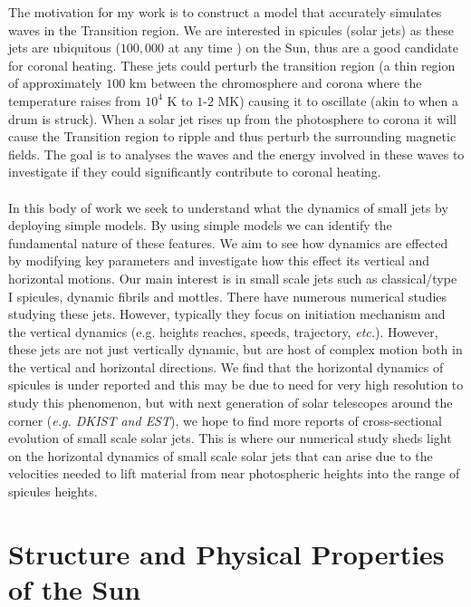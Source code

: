 \documentclass[12pt]{ociamthesis}
\newcommand{\np}{\\ \\}
\begin{document}
The motivation for my work is to construct a model that accurately simulates waves in the Transition region. We are interested in spicules (solar jets) as these jets are ubiquitous ($100,000$  at  any  time \citep{Beckers1968}) on the Sun, thus are a good candidate for coronal heating. These jets could perturb the transition region (a thin region of approximately $100$ km between the chromosphere and corona where the temperature raises from $10^4$ K to $1$-$2$ MK) causing it to oscillate (akin to when a drum is struck). When a solar jet rises up from the photosphere to corona it will cause the Transition region to ripple and thus perturb the surrounding magnetic fields. The goal is to analyses the waves and the energy involved in these waves to investigate if they could significantly contribute to coronal heating. \np
%
In this body of work we seek to understand what the dynamics of small jets by deploying simple models. By using simple models we can identify the fundamental nature of these features. We aim to see how dynamics are effected by modifying key parameters and investigate how this effect its vertical and horizontal motions. Our main interest is in small scale jets such as classical/type I spicules, dynamic fibrils and mottles. There have numerous numerical studies studying these jets. However, typically they focus on initiation mechanism and the vertical dynamics (e.g. heights reaches, speeds, trajectory, \textit{etc.}). However, these jets are not just vertically dynamic, but are host of complex motion both in the vertical and horizontal directions. We find that the horizontal dynamics of spicules is under reported and this may be due to need for very high resolution to study this phenomenon, but with next generation of solar telescopes around the corner (\textit{e.g. DKIST and EST}), we hope to find more reports of cross-sectional evolution of small scale solar jets. This is where our numerical study sheds light on the horizontal dynamics of small scale solar jets that can arise due to the velocities needed to lift material from near photospheric heights into the range of spicules heights.    
\section{Structure and Physical Properties of the Sun}
\label{sec:structure}
\end{document}
